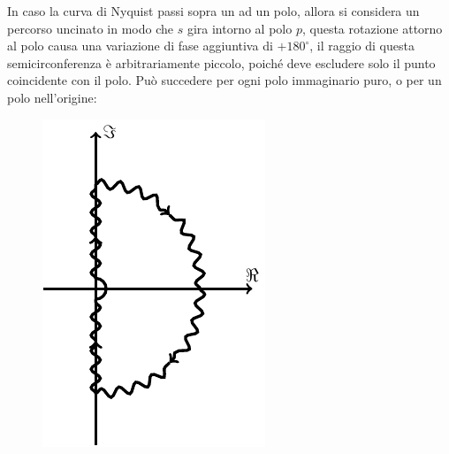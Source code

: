\documentclass{article}
\numberwithin{equation}{subsection}
\begin{document}
\begin{figure}[H]%
    \centering
    \qquad
\end{figure}

In caso la curva di Nyquist passi sopra un ad un polo, allora si considera un percorso uncinato in modo che $s$ gira intorno al polo $p$, questa rotazione attorno al polo 
causa una variazione di fase aggiuntiva di $+180^{\circ}$, il raggio di questa semicirconferenza è arbitrariamente piccolo, poiché deve escludere solo il punto coincidente 
con il polo. Può succedere per ogni polo immaginario puro, o per un polo nell'origine: 

\begin{figure}[H]%
    \centering
    \includegraphics{nyquist-4.pdf}%
\end{figure}
\end{document}
